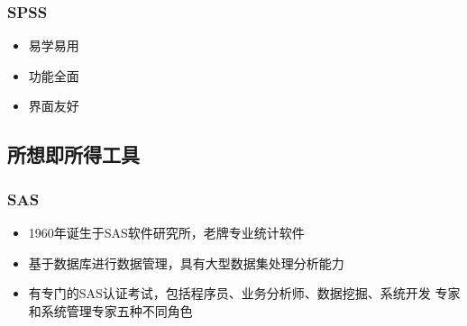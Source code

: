 \subsubsection{SPSS}
\begin{frame}{\subsecname}{\subsubsecname}
  \begin{itemize}
    \item 易学易用
    \item 功能全面
    \item 界面友好
  \end{itemize}

\begin{overlayarea}{\textwidth}{\textheight}
   
\end{overlayarea}
\end{frame}

\subsection{所想即所得工具}
\subsubsection{SAS}
\begin{frame}[t]{\subsecname}{\subsubsecname}
  \begin{itemize}
    \item<1-> 1960年诞生于SAS软件研究所，老牌专业统计软件
    \item<2-> 基于数据库进行数据管理，具有大型数据集处理分析能力
    \item<3-> 有专门的SAS认证考试，包括程序员、业务分析师、数据挖掘、系统开发
           专家和系统管理专家五种不同角色
  \end{itemize}
  
  \begin{overlayarea} {\textwidth}{\textheight}
  \end{overlayarea}
\end{frame}

